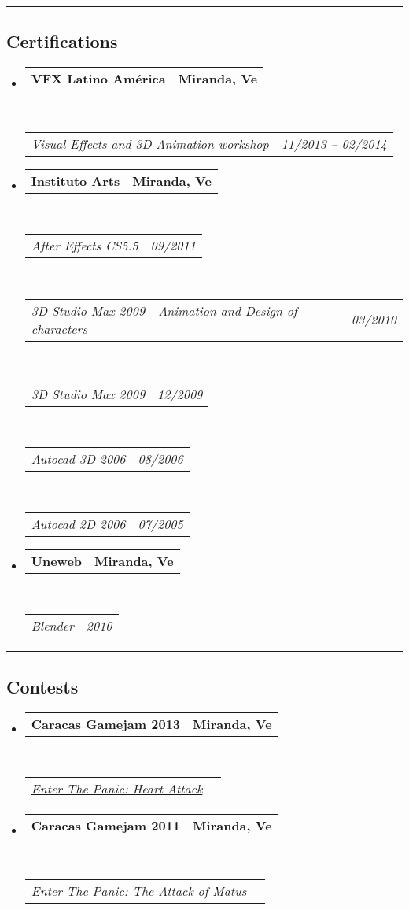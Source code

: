 \documentclass[10pt,letterpaper]{article}
\makeatletter
\newcommand{\headerrow}[2]
{\begin{tabular*}{\linewidth}{l@{\extracolsep{\fill}}r}
	#1 &
	#2 \\
\end{tabular*}}
\makeatother
\begin{document}
\hrule
\vspace{-0.4em}
\subsection*{Certifications}

\begin{itemize}
	\parskip=0.1em

\item 
   \headerrow
   {\textbf{VFX Latino América}}
   {\textbf{Miranda, Ve}}
  \\
  \headerrow
   {\emph{Visual Effects and 3D Animation workshop}}
   {\emph{11/2013 -- 02/2014}}

\item 
   \headerrow
   {\textbf{Instituto Arts}}
   {\textbf{Miranda, Ve}}
	\\
	\headerrow
   {\emph{After Effects CS5.5}}
   {\emph{09/2011}}
	\\
	\headerrow
   {\emph{3D Studio Max 2009 - Animation and Design of characters}}
   {\emph{03/2010}}
	\\
	\headerrow
   {\emph{3D Studio Max 2009}}
   {\emph{12/2009}}
	\\
	\headerrow
   {\emph{Autocad 3D 2006 }}
   {\emph{08/2006}}
	\\
	\headerrow
   {\emph{Autocad 2D 2006}}
   {\emph{07/2005}}

\item 
   \headerrow
   {\textbf{Uneweb}}
   {\textbf{Miranda, Ve}}
	\\
	\headerrow
   {\emph{Blender}}
   {\emph{2010}}
\end{itemize}



\hrule
\vspace{-0.4em}
\subsection*{Contests}

\begin{itemize}
	\parskip=0.1em
\item 
   \headerrow
   {\textbf{Caracas Gamejam 2013}}
   {\textbf{Miranda, Ve}}
	\\
	\headerrow
   {\emph{\href{http://globalgamejam.org/2013/enter-panic-heart-attack}{Enter The Panic: Heart Attack}}}{}
\item 
   \headerrow
   {\textbf{Caracas Gamejam 2011}}
   {\textbf{Miranda, Ve}}
	\\
	\headerrow
   {\emph{\href{http://archive.globalgamejam.org/2011/enter-panic-attack-matus}{Enter The Panic: The Attack of Matus}}}{}
\end{itemize}
\end{document}
